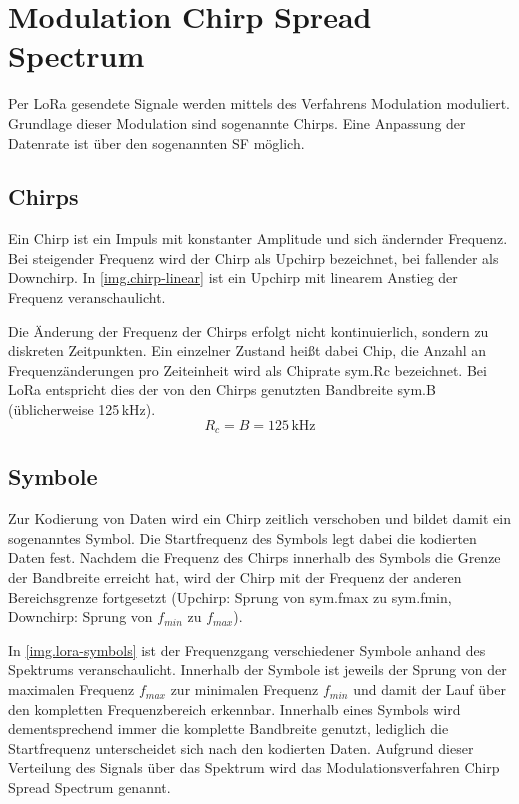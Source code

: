 \section{Modulation Chirp Spread Spectrum }\label{sec.lora.modulation}
Per LoRa gesendete Signale werden mittels des Verfahrens \gls{Modulation} moduliert.
Grundlage dieser Modulation sind sogenannte \glspl{Chirp}.
Eine Anpassung der Datenrate ist über den sogenannten \gls{SF} möglich.


\subsection{Chirps}\label{sec.lora.modulation.chirp}
Ein Chirp ist ein Impuls mit konstanter Amplitude und sich ändernder Frequenz.
Bei steigender Frequenz wird der Chirp als Upchirp bezeichnet, bei fallender als Downchirp.
In \autoref{img.chirp-linear} ist ein Upchirp mit linearem Anstieg der Frequenz veranschaulicht.

Die Änderung der Frequenz der Chirps erfolgt nicht kontinuierlich, sondern zu diskreten Zeitpunkten.
Ein einzelner Zustand heißt dabei Chip, die Anzahl an Frequenzänderungen pro Zeiteinheit wird als Chiprate \gls{sym.Rc} bezeichnet.
Bei LoRa entspricht dies der von den Chirps genutzten Bandbreite \gls{sym.B} (üblicherweise 125\,kHz).
\cite[S. 10]{loramodulation}
\begin{equation}
	R_c = B = 125\,\mathrm{kHz}
	\label{eq.chip-rate}
\end{equation}


\subsection{Symbole}
Zur Kodierung von Daten wird ein Chirp zeitlich verschoben und bildet damit ein sogenanntes Symbol.
Die Startfrequenz des Symbols legt dabei die kodierten Daten fest.
Nachdem die Frequenz des Chirps innerhalb des Symbols die Grenze der Bandbreite erreicht hat, wird der Chirp mit der Frequenz der anderen Bereichsgrenze fortgesetzt (Upchirp: Sprung von \gls{sym.fmax} zu \gls{sym.fmin}, Downchirp: Sprung von $f_{min}$ zu $f_{max}$).
\cite{lorachirps}

In \autoref{img.lora-symbols} ist der Frequenzgang verschiedener Symbole anhand des Spektrums veranschaulicht.
Innerhalb der Symbole ist jeweils der Sprung von der maximalen Frequenz $f_{max}$ zur minimalen Frequenz $f_{min}$ und damit der Lauf über den kompletten Frequenzbereich erkennbar.
Innerhalb eines Symbols wird dementsprechend immer die komplette Bandbreite genutzt, lediglich die Startfrequenz unterscheidet sich nach den kodierten Daten.
Aufgrund dieser Verteilung des Signals über das Spektrum wird das Modulationsverfahren Chirp Spread Spectrum genannt.

